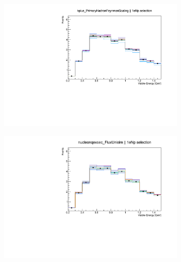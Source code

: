 \documentclass[a4paper]{article}
\begin{document}
\begin{figure}[ht] 
\begin{center}
    \begin{subfigure}[b]{0.33\textwidth}
    \centering
    \includegraphics[width=1.00\textwidth]{systvariations/Variation_nue_reco_e_genietune_run1_kplus_PrimaryHadronFeynmanScaling_nu_uBooNE_nue_intrinsic.pdf}
    \end{subfigure}
    \begin{subfigure}[b]{0.33\textwidth}
    \centering
    \includegraphics[width=1.00\textwidth]{systvariations/Variation_nue_reco_e_genietune_run1_nucleonqexsec_FluxUnisim_nu_uBooNE_nue_intrinsic.pdf}

\end{subfigure}
\end{center}
\end{figure}
\end{document}
